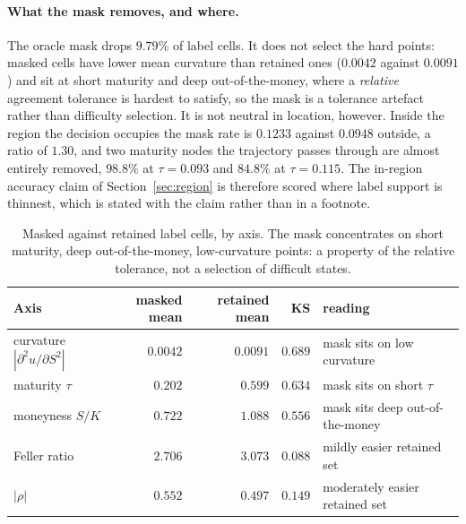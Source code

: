 \documentclass{article}
\begin{document}
\paragraph{What the mask removes, and where.} The oracle mask drops $9.79\%$ of
label cells. It does not select the hard points: masked cells have lower mean
curvature than retained ones ($0.0042$ against $0.0091$) and sit at short maturity
and deep out-of-the-money, where a \emph{relative} agreement tolerance is hardest to
satisfy, so the mask is a tolerance artefact rather than difficulty selection.
It is not neutral in location, however. Inside the region the decision occupies the
mask rate is $0.1233$ against $0.0948$ outside, a ratio of $1.30$, and two maturity
nodes the trajectory passes through are almost entirely removed, $98.8\%$ at
$\tau = 0.093$ and $84.8\%$ at $\tau = 0.115$. The in-region accuracy claim of
Section~\ref{sec:region} is therefore scored where label support is thinnest, which
is stated with the claim rather than in a footnote.

\begin{table}[h]
\caption{Masked against retained label cells, by axis. The mask concentrates on
short maturity, deep out-of-the-money, low-curvature points: a property of the
relative tolerance, not a selection of difficult states.}
\label{tab:mask}
\centering\footnotesize\setlength{\tabcolsep}{6pt}
\begin{tabular}{@{}lrrrl@{}}
\toprule
Axis & masked mean & retained mean & KS & reading \\
\midrule
curvature $|\partial^{2}u/\partial S^{2}|$ & $0.0042$ & $0.0091$ & $0.689$ & mask sits on low curvature \\
maturity $\tau$ & $0.202$ & $0.599$ & $0.634$ & mask sits on short $\tau$ \\
moneyness $S/K$ & $0.722$ & $1.088$ & $0.556$ & mask sits deep out-of-the-money \\
Feller ratio & $2.706$ & $3.073$ & $0.088$ & mildly easier retained set \\
$|\rho|$ & $0.552$ & $0.497$ & $0.149$ & moderately easier retained set \\
\bottomrule
\end{tabular}
\end{table}
\end{document}

